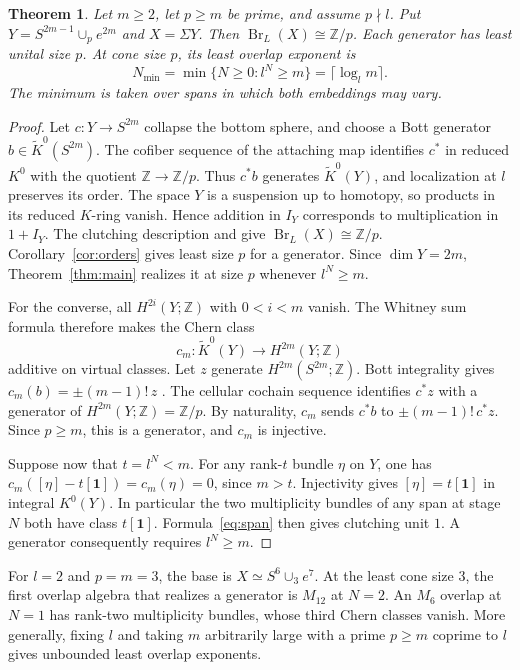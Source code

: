 \documentclass[11pt]{article}
\newtheorem{theorem}{Theorem}[section]
\DeclareMathOperator{\Br}{Br}
\newcommand{\Z}{\mathbb Z}
\newcommand{\triv}{\mathbf 1}
\newcommand{\IY}{I_Y}
\begin{document}
\begin{theorem}\label{thm:sharp-moore}
Let \(m\geq2\), let \(p\geq m\) be prime, and assume \(p\nmid l\).
Put \(Y=S^{2m-1}\cup_p e^{2m}\) and \(X=\Sigma Y\). Then
\(\Br_L(X)\cong\Z/p\). Each generator has least unital size \(p\).
At cone size \(p\), its least overlap exponent is
\[
 N_{\min}=\min\{N\geq0:l^N\geq m\}=\lceil\log_l m\rceil .
\]
The minimum is taken over spans in which both embeddings may vary.
\end{theorem}
\begin{proof}
Let \(c:Y\to S^{2m}\) collapse the bottom sphere, and choose a Bott
generator \(b\in\widetilde K^0(S^{2m})\). The cofiber sequence of
the attaching map identifies \(c^*\) in reduced \(K^0\) with the
quotient \(\Z\to\Z/p\). Thus \(c^*b\) generates
\(\widetilde K^0(Y)\), and localization at \(l\) preserves its order.
The space \(Y\) is a suspension up to homotopy, so products in its
reduced \(K\)-ring vanish. Hence addition in \(\IY\) corresponds to
multiplication in \(1+\IY\). The clutching description and
\cite[Theorem~2.15(ii)]{DP2} give \(\Br_L(X)\cong\Z/p\).
Corollary~\ref{cor:orders} gives least size \(p\) for a generator.
Since \(\dim Y=2m\), Theorem~\ref{thm:main} realizes it at size \(p\)
whenever \(l^N\geq m\).

For the converse, all \(H^{2i}(Y;\Z)\) with \(0<i<m\) vanish.
The Whitney sum formula therefore makes the Chern class
\[
 c_m:\widetilde K^0(Y)\longrightarrow H^{2m}(Y;\Z)
\]
additive on virtual classes. Let \(z\) generate \(H^{2m}(S^{2m};\Z)\).
Bott integrality gives \(c_m(b)=\pm(m-1)!\,z\)
\cite[p.~308, Corollary~9.8]{Husemoller}. The cellular cochain
sequence identifies \(c^*z\) with a generator of \(H^{2m}(Y;\Z)=\Z/p\).
By naturality, \(c_m\) sends \(c^*b\) to \(\pm(m-1)!\,c^*z\).
Since \(p\geq m\), this is a generator, and \(c_m\) is injective.

Suppose now that \(t=l^N<m\). For any rank-\(t\) bundle \(\eta\) on
\(Y\), one has \(c_m([\eta]-t[\triv])=c_m(\eta)=0\), since \(m>t\).
Injectivity gives \([\eta]=t[\triv]\) in integral \(K^0(Y)\).
In particular the two multiplicity bundles of any span at stage \(N\)
both have class \(t[\triv]\). Formula~\eqref{eq:span} then gives
clutching unit \(1\). A generator consequently requires \(l^N\geq m\).
\end{proof}

For \(l=2\) and \(p=m=3\), the base is \(X\simeq S^6\cup_3 e^7\).
At the least cone size \(3\), the first overlap algebra that realizes
a generator is \(M_{12}\) at \(N=2\). An \(M_6\) overlap at \(N=1\)
has rank-two multiplicity bundles, whose third Chern classes vanish.
More generally, fixing \(l\) and taking \(m\) arbitrarily large with
a prime \(p\geq m\) coprime to \(l\) gives unbounded least overlap
exponents.
\end{document}
